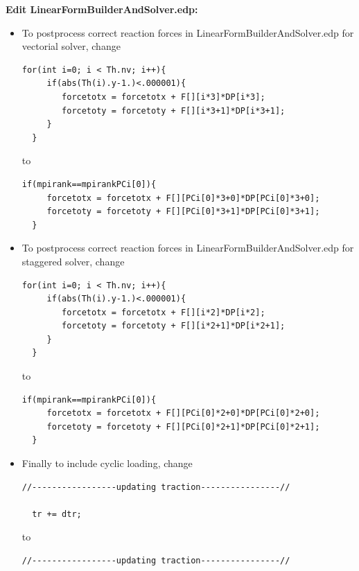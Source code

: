 \textbf{Edit LinearFormBuilderAndSolver.edp:}

\begin{itemize}

\item To postprocess correct reaction forces in LinearFormBuilderAndSolver.edp for vectorial solver, change

\begin{lstlisting}[style=CppStyle]
  for(int i=0; i < Th.nv; i++){
     if(abs(Th(i).y-1.)<.000001){
        forcetotx = forcetotx + F[][i*3]*DP[i*3];
        forcetoty = forcetoty + F[][i*3+1]*DP[i*3+1];
     }
  }
\end{lstlisting}

to

\begin{lstlisting}[style=CppStyle]
  if(mpirank==mpirankPCi[0]){
     forcetotx = forcetotx + F[][PCi[0]*3+0]*DP[PCi[0]*3+0];
     forcetoty = forcetoty + F[][PCi[0]*3+1]*DP[PCi[0]*3+1];
  }
\end{lstlisting}

\item To postprocess correct reaction forces in LinearFormBuilderAndSolver.edp for staggered solver, change

\begin{lstlisting}[style=CppStyle]
  for(int i=0; i < Th.nv; i++){
     if(abs(Th(i).y-1.)<.000001){
        forcetotx = forcetotx + F[][i*2]*DP[i*2];
        forcetoty = forcetoty + F[][i*2+1]*DP[i*2+1];
     }
  }
\end{lstlisting}

to

\begin{lstlisting}[style=CppStyle]
  if(mpirank==mpirankPCi[0]){
     forcetotx = forcetotx + F[][PCi[0]*2+0]*DP[PCi[0]*2+0];
     forcetoty = forcetoty + F[][PCi[0]*2+1]*DP[PCi[0]*2+1];
  }
\end{lstlisting}

\item Finally to include cyclic loading, change

\begin{lstlisting}[style=CppStyle]
  //-----------------updating traction----------------//

  tr += dtr;
\end{lstlisting}


to

\begin{lstlisting}[style=CppStyle]
  //-----------------updating traction----------------//


\end{lstlisting}
\end{itemize}
